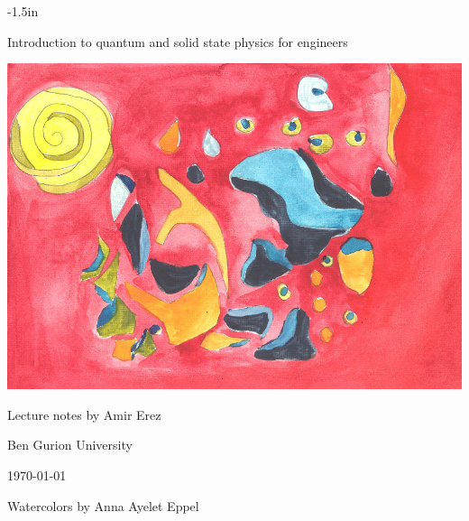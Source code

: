 \documentclass{Textbook}
\begin{document}
\thispagestyle{empty}
\begin{adjustwidth}{}{-1.5in}

 \centering
 \vspace{1in}
 \Huge Introduction to quantum and solid state physics for engineers
 \normalsize



\vspace{2cm}
\noindent \parbox{16cm}{
    \captionsetup{type=figure}
    \centering \includegraphics[width=17cm]{Anna_cover_smj}
    } 
\vspace{2cm}


\noindent Lecture notes by Amir Erez 

\noindent Ben Gurion University

\today

\noindent Watercolors by Anna Ayelet Eppel

\end{adjustwidth}
\end{document}
